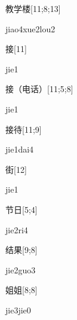 \begin{verbete}{教学楼}[11;8;13]
\begin{pronuncia}{jiao4xue2lou2}
\end{pronuncia}
\end{verbete}

\begin{verbete}[jie1]{接}[11]
\begin{pronuncia}{jie1}
\end{pronuncia}
\end{verbete}

\begin{verbete}[jie1]{接（电话）}[11;5;8]
\begin{pronuncia}{jie1}
\end{pronuncia}
\end{verbete}

\begin{verbete}{接待}[11;9]
\begin{pronuncia}{jie1dai4}
\end{pronuncia}
\end{verbete}

\begin{verbete}[jie1]{街}[12]
\begin{pronuncia}{jie1}
\end{pronuncia}
\end{verbete}

\begin{verbete}[jie2ri4]{节日}[5;4]
\begin{pronuncia}{jie2ri4}
\end{pronuncia}
\end{verbete}

\begin{verbete}{结果}[9;8]
\begin{pronuncia}{jie2guo3}
\end{pronuncia}
\end{verbete}

\begin{verbete}{姐姐}[8;8]
\begin{pronuncia}{jie3jie0}
\end{pronuncia}
\end{verbete}

